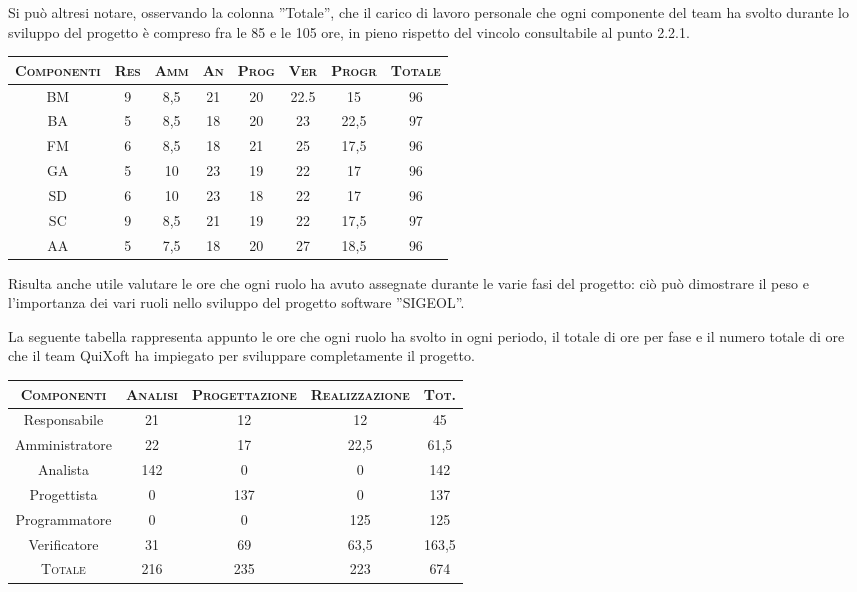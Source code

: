 \documentclass[11pt,a4paper]{article}
\begin{document}
Si può altresi notare, osservando la colonna ''Totale'', che il carico di lavoro personale che ogni componente del team ha svolto durante lo sviluppo del progetto è compreso fra le 85 e le 105 ore, in pieno rispetto del vincolo consultabile al punto 2.2.1.
\\
\begin{center}
\begin{tabular}{|c||c|c|c|c|c|c||c|}
\hline
\textsc{Componenti} & \textsc{Res} & \textsc{Amm} & \textsc{An} & \textsc{Prog} & \textsc{Ver} & \textsc{Progr} & \textsc{Totale}\\
\hline \hline
BM & 9 & 8,5 & 21 & 20 & 22.5 & 15 & 96 \\ \hline
BA & 5 & 8,5 & 18 & 20 & 23 & 22,5 & 97 \\ \hline
FM & 6 & 8,5 & 18 & 21 & 25 & 17,5 & 96 \\ \hline
GA & 5 & 10 & 23 & 19 & 22 & 17 & 96 \\ \hline
SD & 6 & 10 & 23 & 18 & 22 & 17 & 96 \\ \hline
SC & 9 & 8,5 & 21 & 19 & 22 & 17,5 & 97 \\ \hline
AA & 5 & 7,5 & 18 & 20 & 27 & 18,5 & 96 \\ \hline
\end{tabular}
\end{center}


Risulta anche utile valutare le ore che ogni ruolo ha avuto assegnate durante le varie fasi del progetto: ciò può dimostrare il peso e l'importanza dei vari ruoli nello sviluppo del progetto software ''SIGEOL''.

La seguente tabella rappresenta appunto le ore che ogni ruolo ha svolto in ogni periodo, il totale di ore per fase e il numero totale di ore che il team QuiXoft ha impiegato per sviluppare completamente il progetto.
\\
\begin{center}
\begin{tabular}{|c||c|c|c||c|}
\hline
\textsc{Componenti}& \textsc{Analisi} & \textsc{Progettazione} & \textsc{Realizzazione} & \textsc{Tot.} \\ \hline \hline
Responsabile & 21 & 12 & 12 & 45 \\ \hline
Amministratore & 22 & 17 & 22,5 & 61,5 \\ \hline
Analista & 142 & 0 & 0 & 142 \\ \hline
Progettista & 0 & 137 & 0 & 137 \\ \hline
Programmatore & 0 & 0 & 125 & 125 \\ \hline
Verificatore & 31 & 69 & 63,5 & 163,5 \\ \hline \hline
\textsc{Totale} & 216 & 235 & 223 & 674 \\ \hline
\end{tabular}
\end{center}
\bigskip
\end{document}
